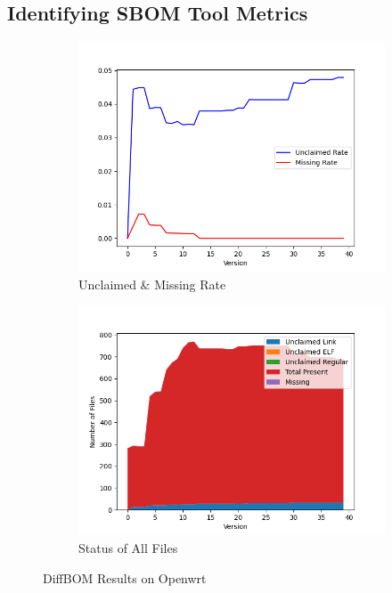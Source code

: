 \subsection{Identifying SBOM Tool Metrics}
\begin{figure}[h!]
	\centering
	\begin{subfigure}[b]{0.4\linewidth}
		\includegraphics[width=\linewidth]{graph/fig1a.png}
		\caption{Unclaimed \& Missing Rate}
	\end{subfigure}
	\begin{subfigure}[b]{0.4\linewidth}
		\includegraphics[width=\linewidth]{graph/fig1b.png}
		\caption{Status of All Files}
	\end{subfigure}
	\caption{DiffBOM Results on Openwrt}
	\label{fig:openwrt}
\end{figure}
